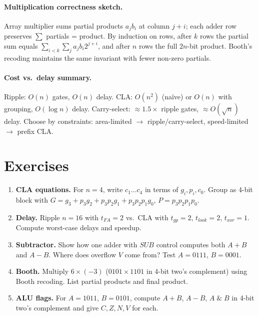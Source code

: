 \paragraph{Multiplication correctness sketch.} Array multiplier sums partial products $a_jb_i$ at column $j+i$; each adder row preserves
$\sum$ partials = product. By induction on rows, after $k$ rows the partial sum equals $\sum_{i<k}\sum_j a_jb_i2^{j+i}$,
and after $n$ rows the full $2n$-bit product. Booth's recoding maintains the same invariant with fewer non-zero partials.

\paragraph{Cost vs.\ delay summary.} Ripple: $O(n)$ gates, $O(n)$ delay. CLA: $O(n^2)$ (na\"ive) or $O(n)$ with grouping, $O(\log n)$ delay. Carry-select: $\approx1.5\times$ ripple gates, $\approx O(\sqrt n)$ delay. Choose by constraints: area-limited $\to$ ripple/carry-select, speed-limited $\to$ prefix CLA.

\section{Exercises}
\label{sec:ch07-exercises}
\begin{enumerate}[label=E7.\arabic*, leftmargin=*, itemsep=0.8em]
    \item \textbf{CLA equations.} For $n=4$, write $c_1\dots c_4$ in terms of $g_i,p_i,c_0$. Group as 4-bit block with $G=g_3+p_3g_2+p_3p_2g_1+p_3p_2p_1g_0$, $P=p_3p_2p_1p_0$.
    \item \textbf{Delay.} Ripple $n=16$ with $t_{FA}=2$ vs.\ CLA with $t_{gp}=2$, $t_{look}=2$, $t_{xor}=1$. Compute worst-case delays and speedup.
    \item \textbf{Subtractor.} Show how one adder with $SUB$ control computes both $A+B$ and $A-B$. Where does overflow $V$ come from? Test $A=0111$, $B=0001$.
    \item \textbf{Booth.} Multiply $6\times(-3)$ ($0101\times1101$ in 4-bit two's complement) using Booth recoding. List partial products and final product.
    \item \textbf{ALU flags.} For $A=1011$, $B=0101$, compute $A+B$, $A-B$, $A\;\&\;B$ in 4-bit two's complement and give $C,Z,N,V$ for each.
\end{enumerate}
